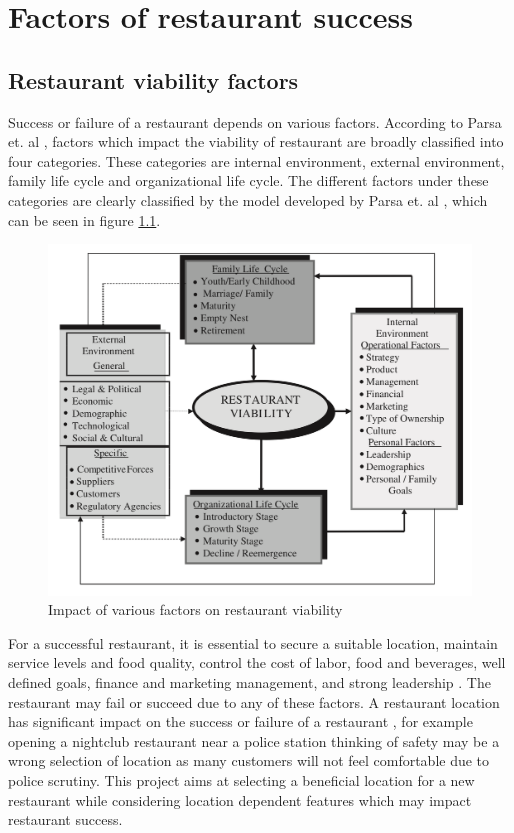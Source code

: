 \documentclass[a4paper, 11pt, oneside]{Thesis}  %
\begin{document}
\chapter{Factors of restaurant success}
\label{factors_of_restaurant_success}

\section{Restaurant viability factors}
\label{viability_factors}

Success or failure of a restaurant depends on various factors. According to Parsa et. al \cite{Parsa.2005}, factors which impact the viability of restaurant are broadly classified into four categories. These categories are internal environment, external environment, family life cycle and organizational life cycle. The different factors under these categories are clearly classified by the model developed by Parsa et. al \cite{Parsa.2005}, which can be seen in figure \ref{fig:Factors_on_restaurant_viability}. 

\begin{figure}[h]
\includegraphics[scale=0.5]{Figures/Restaurant_sucess_factors/Factors_on_restaurant_viability.png}
\centering
\caption{Impact of various factors on restaurant viability \cite{Parsa.2005}}
\label{fig:Factors_on_restaurant_viability}
\end{figure}

For a successful restaurant, it is essential to secure a suitable location, maintain service levels and food quality, control the cost of labor, food and beverages, well defined goals, finance and marketing management, and strong leadership \cite{Parsa.2005}. The restaurant may fail or succeed due to any of these factors. A restaurant location has significant impact on the success or failure of a restaurant , for example opening a nightclub restaurant near a police station thinking of safety may be a wrong selection of location as many customers will not feel comfortable due to police scrutiny. This project aims at selecting a beneficial location for a new restaurant while considering location dependent features which may impact restaurant success.
\end{document}
